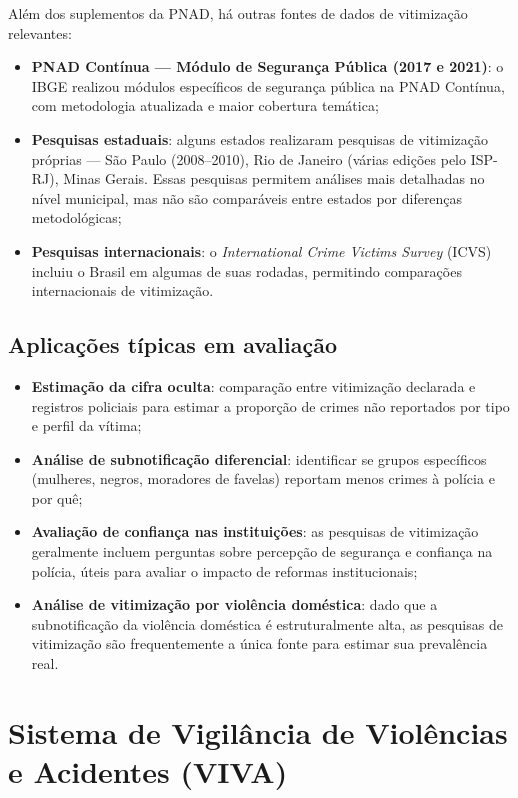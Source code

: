 Além dos suplementos da PNAD, há outras fontes de dados de vitimização relevantes:

\begin{itemize}
  \item \textbf{PNAD Contínua --- Módulo de Segurança Pública (2017 e 2021)}: o IBGE realizou módulos específicos de segurança pública na PNAD Contínua, com metodologia atualizada e maior cobertura temática;
  \item \textbf{Pesquisas estaduais}: alguns estados realizaram pesquisas de vitimização próprias --- São Paulo (2008--2010), Rio de Janeiro (várias edições pelo ISP-RJ), Minas Gerais. Essas pesquisas permitem análises mais detalhadas no nível municipal, mas não são comparáveis entre estados por diferenças metodológicas;
  \item \textbf{Pesquisas internacionais}: o \textit{International Crime Victims Survey} (ICVS) incluiu o Brasil em algumas de suas rodadas, permitindo comparações internacionais de vitimização.
\end{itemize}

\subsection{Aplicações típicas em avaliação}

\begin{itemize}
  \item \textbf{Estimação da cifra oculta}: comparação entre vitimização declarada e registros policiais para estimar a proporção de crimes não reportados por tipo e perfil da vítima;
  \item \textbf{Análise de subnotificação diferencial}: identificar se grupos específicos (mulheres, negros, moradores de favelas) reportam menos crimes à polícia e por quê;
  \item \textbf{Avaliação de confiança nas instituições}: as pesquisas de vitimização geralmente incluem perguntas sobre percepção de segurança e confiança na polícia, úteis para avaliar o impacto de reformas institucionais;
  \item \textbf{Análise de vitimização por violência doméstica}: dado que a subnotificação da violência doméstica é estruturalmente alta, as pesquisas de vitimização são frequentemente a única fonte para estimar sua prevalência real.
\end{itemize}

\section{Sistema de Vigilância de Violências e Acidentes (VIVA)}

